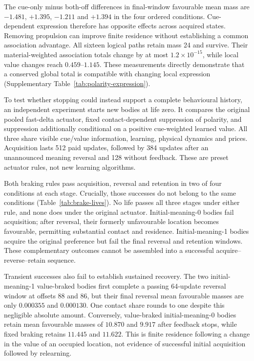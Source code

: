 The cue-only minus both-off differences in final-window favourable mean mass are $-1.481$, $+1.395$, $-1.211$ and $+1.394$ in the four ordered conditions. Cue-dependent expression therefore has opposite effects across acquired states. Removing propulsion can improve finite residence without establishing a common association advantage. All sixteen logical paths retain mass 24 and survive. Their material-weighted association totals change by at most $1.2\times10^{-15}$, while local value changes reach $0.459$--$1.145$. These measurements directly demonstrate that a conserved global total is compatible with changing local expression (Supplementary Table~\ref{tab:polarity-expression}).

To test whether stopping could instead support a complete behavioural history, an independent experiment starts new bodies at life zero. It compares the original pooled fast-delta actuator, fixed contact-dependent suppression of polarity, and suppression additionally conditional on a positive cue-weighted learned value. All three share visible cue/value information, learning, physical dynamics and prices. Acquisition lasts 512 paid updates, followed by 384 updates after an unannounced meaning reversal and 128 without feedback. These are preset actuator rules, not new learning algorithms.

Both braking rules pass acquisition, reversal and retention in two of four conditions at each stage. Crucially, those successes do not belong to the same conditions (Table~\ref{tab:brake-lives}). No life passes all three stages under either rule, and none does under the original actuator. Initial-meaning-0 bodies fail acquisition; after reversal, their formerly unfavourable location becomes favourable, permitting substantial contact and residence. Initial-meaning-1 bodies acquire the original preference but fail the final reversal and retention windows. These complementary outcomes cannot be assembled into a successful acquire--reverse--retain sequence.



Transient successes also fail to establish sustained recovery. The two initial-meaning-1 value-braked bodies first complete a passing 64-update reversal window at offsets 88 and 86, but their final reversal mean favourable masses are only $0.000355$ and $0.000130$. One contact share rounds to one despite this negligible absolute amount. Conversely, value-braked initial-meaning-0 bodies retain mean favourable masses of $10.870$ and $9.917$ after feedback stops, while fixed braking retains $11.445$ and $11.622$. This is finite residence following a change in the value of an occupied location, not evidence of successful initial acquisition followed by relearning.

